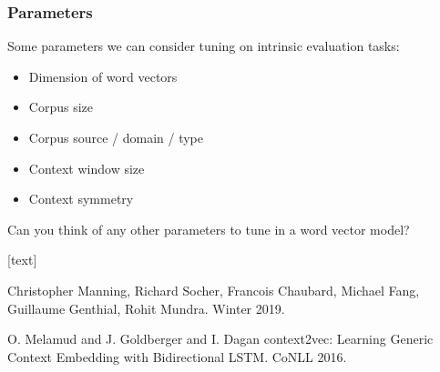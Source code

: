 \begin{frame}
	\frametitle{Parameters}
	\begin{block}{}
	Some parameters we can consider tuning on intrinsic evaluation tasks:
	\begin{itemize}[<+->]
		\item Dimension of word vectors
		\item Corpus size
		\item Corpus source / domain / type
		\item Context window size
		\item Context symmetry
	\end{itemize}
	Can you think of any other parameters to tune in a word vector model?
	\end{block}
\end{frame}


\begin{frame}
[text]
\begin{thebibliography}{10}

\alert{Christopher Manning, Richard Socher, Francois Chaubard, Michael Fang, Guillaume Genthial, Rohit Mundra.}
\newblock Winter 2019.


\alert{O. Melamud and J. Goldberger and I. Dagan}
\newblock context2vec: Learning Generic Context Embedding with Bidirectional LSTM.
\newblock CoNLL 2016.
\end{thebibliography}
\end{frame}





